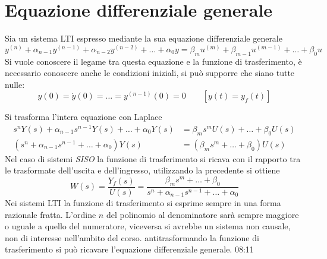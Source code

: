 
\section{Equazione differenziale generale}
Sia un sistema LTI espresso mediante la sua equazione differenziale generale
$$
y^{(n)} + \alpha_{n-1}y^{(n-1)} + \alpha_{n-2}y^{(n-2)} + \ldots +
\alpha_0 y = \beta_mu^{(m)}+ \beta_{m-1}u^{(m-1)} +
\ldots + \beta_0 u
$$
Si vuole conoscere il legame tra questa equazione e la funzione di
trasferimento, è necessario conoscere anche le condizioni iniziali, si può
supporre che siano tutte nulle:
$$
y(0) = \dot{y}(0) = \ldots = y^{(n-1)}(0) = 0 \qquad
[y(t)=y_f(t)]
$$

Si trasforma l'intera equazione con Laplace
$$\begin{aligned}
s^nY(s)+\alpha_{n-1}s^{n-1}Y(s) + \ldots + \alpha_0 Y(s) &= \beta_m s^m U(s) +
\ldots + \beta_0U(s)\\
\left(s^n+\alpha_{n-1}s^{n-1} + \ldots + \alpha_0 \right)Y(s) &= \left(\beta_m
s^m  +
\ldots + \beta_0\right)U(s)
\end{aligned}$$
Nel caso di sistemi \textit{SISO} la funzione di trasferimento si ricava con il
rapporto tra le trasformate dell'uscita e dell'ingresso, utilizzando la
precedente si ottiene
$$
W(s) = \frac{Y_f(s)}{U(s)} = \frac{\beta_m
s^m  +
\ldots + \beta_0}{s^n+\alpha_{n-1}s^{n-1} + \ldots +
\alpha_0}
$$
Nei sistemi LTI la funzione di trasferimento si esprime sempre in una forma
razionale fratta. L'ordine $n$ del polinomio al denominatore sarà sempre
maggiore o uguale a quello del numeratore, viceversa si avrebbe un sistema non
causale, non di interesse nell'ambito del corso.
antitrasformando la funzione di trasferimento si può ricavare l'equazione
differenziale generale.
08:11
